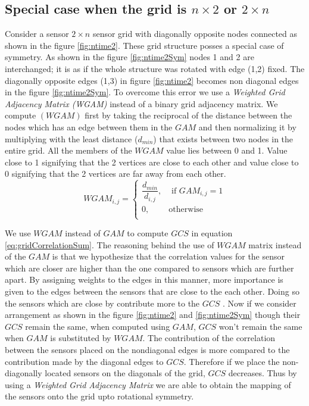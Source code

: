 \subsection{Special case when the grid is $n \times 2$ or $2 \times n$}
Consider a sensor $2 \times n$ sensor grid with diagonally opposite nodes connected as shown in the figure \ref{fig:ntime2}. These grid structure posses a special case of symmetry. As shown in the  figure \ref{fig:ntime2Sym} nodes 1 and 2 are interchanged; it is as if the whole structure was rotated with  edge (1,2) fixed. The diagonally opposite edges (1,3) in figure \ref{fig:ntime2} becomes non diagonal edges in the figure \ref{fig:ntime2Sym}. To overcome this error we use a \textit{Weighted Grid Adjacency Matrix (WGAM)} instead of a binary grid adjacency matrix. We compute $(WGAM)$ first by taking the reciprocal of the distance between the nodes which has an edge between them in the $GAM$ and then normalizing it by multiplying with the least distance ($d_{min}$) that exists between two nodes in the entire grid. All the members of the $WGAM$ value lies between 0 and 1. Value close to 1 signifying that the 2 vertices are close to each other and value close to 0 signifying that the 2 vertices are far away from each other.\\
\[
WGAM_{i,j} = 
\begin{cases}
\dfrac{d_{min}}{d_{i,j}}, &\text{ if } GAM_{i,j} = 1\\
0, & \text{otherwise}\\
\end{cases}
\]


We use $WGAM$ instead of $GAM$ to compute $GCS$ in equation \ref{eq:gridCorrelationSum}. The reasoning behind the use of $WGAM$ matrix instead of the $GAM$ is that we hypothesize that the correlation values for the sensor which are closer are higher than the one compared to sensors which are further apart. By assigning weights to the edges in this manner, more importance is given to the edges between the sensors that are close to the each other. Doing so the sensors which are close by contribute  more to the $GCS$ . 
Now if we consider arrangement as shown in the figure \ref{fig:ntime2} and \ref{fig:ntime2Sym} though their $GCS$ remain the same, when computed using $GAM$, $GCS$ won't remain the same when $GAM$ is substituted by $WGAM$. The contribution of the correlation between the sensors placed on the nondiagonal edges is more compared to the contribution made by the diagonal edges to $GCS$. Therefore if we place the non-diagonally located sensors on the diagonals of the grid, $GCS$ decreases. Thus by using a \textit{Weighted Grid Adjacency Matrix} we are able to obtain the mapping of the sensors onto the grid upto rotational symmetry.

